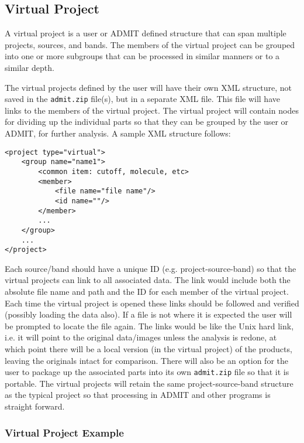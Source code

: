 \documentclass{article}
\begin{document}
\subsection{Virtual Project}
A virtual project is a user or ADMIT defined structure that can span
multiple projects, sources, and bands. The members of the virtual project
can be grouped into one or more subgroups that can be processed in similar
manners or to a similar depth.

The virtual projects defined by the user will have their own XML structure,
not saved in the {\tt admit.zip} file(s), but in a separate XML file. This
file will have links to the members of the virtual project. The virtual
project will contain nodes for dividing up the individual parts so that
they can be grouped by the user or ADMIT, for further analysis. A sample
XML structure follows:

\footnotesize
\begin{verbatim}
<project type="virtual">
    <group name="name1">
        <common item: cutoff, molecule, etc>
        <member>
            <file name="file name"/>
            <id name=""/>
        </member>
        ...
    </group>
    ...
</project>
\end{verbatim}
\normalsize

Each source/band should have a unique ID (e.g. project-source-band) so
that the virtual projects can link to all associated data. The link
would include both the absolute file name and path and the ID for each
member of the virtual project. Each time the virtual project is opened
these links should be followed and verified (possibly loading the data
also). If a file is not where it is expected the user will be prompted
to locate the file again. The links would be like the Unix hard link,
i.e. it will point to the original data/images unless the analysis is
redone, at which point there will be a local version (in the virtual
project) of the products, leaving the originals intact for
comparison. There will also be an option for the user to package up
the associated parts into its own {\tt admit.zip} file so that it is
portable. The virtual projects will retain the same
project-source-band structure as the typical project so that
processing in ADMIT and other programs is straight forward.

\subsubsection{Virtual Project Example}
\end{document}
